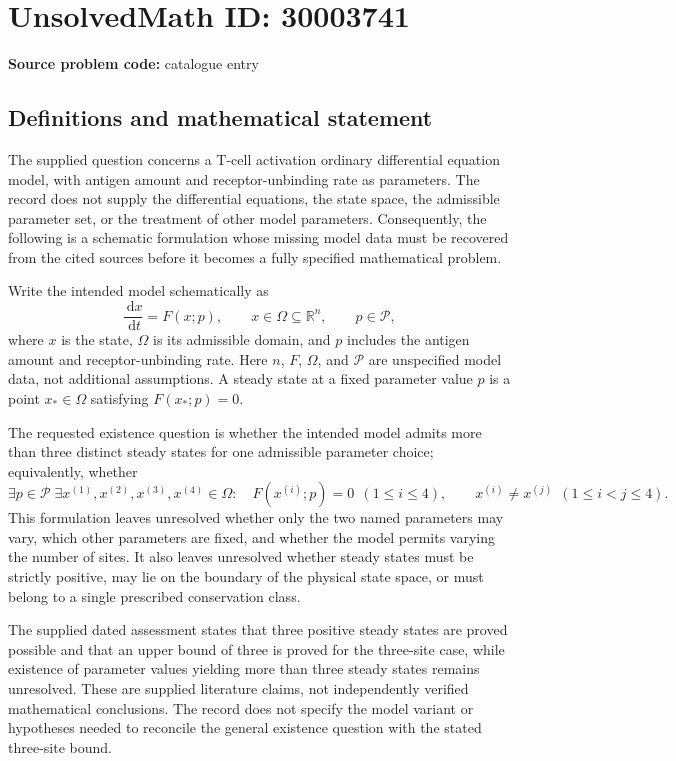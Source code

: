 \documentclass[11pt]{article}
\newcommand{\R}{\mathbb{R}}
\newcommand{\dd}{\,\mathrm{d}}
\begin{document}
\section*{UnsolvedMath ID: 30003741}
\textbf{Source problem code:} catalogue entry
\subsection{Definitions and mathematical statement}
The supplied question concerns a T-cell activation ordinary differential equation model, with antigen amount and receptor-unbinding rate as parameters. The record does not supply the differential equations, the state space, the admissible parameter set, or the treatment of other model parameters. Consequently, the following is a schematic formulation whose missing model data must be recovered from the cited sources before it becomes a fully specified mathematical problem.

Write the intended model schematically as
\[
\frac{\dd x}{\dd t}=F(x;p),\qquad x\in\Omega\subseteq\R^n,\qquad p\in\mathcal P,
\]
where \(x\) is the state, \(\Omega\) is its admissible domain, and \(p\) includes the antigen amount and receptor-unbinding rate. Here \(n\), \(F\), \(\Omega\), and \(\mathcal P\) are unspecified model data, not additional assumptions. A steady state at a fixed parameter value \(p\) is a point \(x_*\in\Omega\) satisfying \(F(x_*;p)=0\).

The requested existence question is whether the intended model admits more than three distinct steady states for one admissible parameter choice; equivalently, whether
\[
\exists p\in\mathcal P\;\exists x^{(1)},x^{(2)},x^{(3)},x^{(4)}\in\Omega:
\quad F(x^{(i)};p)=0\ \ (1\leq i\leq4),\qquad
x^{(i)}\neq x^{(j)}\ \ (1\leq i<j\leq4).
\]
This formulation leaves unresolved whether only the two named parameters may vary, which other parameters are fixed, and whether the model permits varying the number of sites. It also leaves unresolved whether steady states must be strictly positive, may lie on the boundary of the physical state space, or must belong to a single prescribed conservation class.

The supplied dated assessment states that three positive steady states are proved possible and that an upper bound of three is proved for the three-site case, while existence of parameter values yielding more than three steady states remains unresolved. These are supplied literature claims, not independently verified mathematical conclusions. The record does not specify the model variant or hypotheses needed to reconcile the general existence question with the stated three-site bound.
\end{document}

